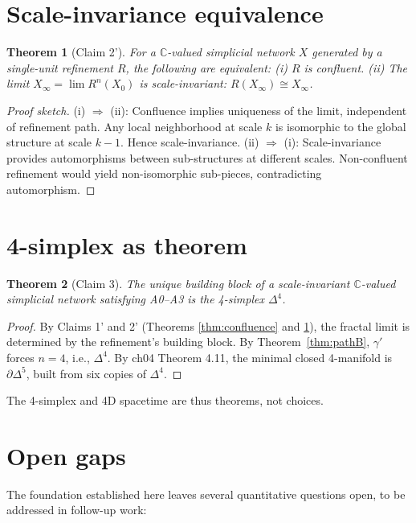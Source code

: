 \documentclass[11pt]{article}
\newtheorem{theorem}{Theorem}
\begin{document}
\section{Scale-invariance equivalence}

\begin{theorem}[Claim 2']
\label{thm:scaleinv}
For a $\mathbb{C}$-valued simplicial network $X$ generated by a
single-unit refinement $R$, the following are equivalent:
(i) $R$ is confluent. (ii) The limit $X_\infty = \lim R^n(X_0)$
is scale-invariant: $R(X_\infty) \cong X_\infty$.
\end{theorem}

\begin{proof}[Proof sketch]
(i) $\Rightarrow$ (ii): Confluence implies uniqueness of the limit,
independent of refinement path. Any local neighborhood at scale $k$
is isomorphic to the global structure at scale $k - 1$. Hence
scale-invariance.
(ii) $\Rightarrow$ (i): Scale-invariance provides automorphisms
between sub-structures at different scales. Non-confluent
refinement would yield non-isomorphic sub-pieces, contradicting
automorphism.
\end{proof}

\section{4-simplex as theorem}

\begin{theorem}[Claim 3]
\label{thm:claim3}
The unique building block of a scale-invariant $\mathbb{C}$-valued
simplicial network satisfying A0--A3 is the 4-simplex $\Delta^4$.
\end{theorem}

\begin{proof}
By Claims 1' and 2' (Theorems \ref{thm:confluence} and
\ref{thm:scaleinv}), the fractal limit is determined by the
refinement's building block. By Theorem~\ref{thm:pathB}, $\gamma'$
forces $n = 4$, i.e., $\Delta^4$. By ch04 Theorem 4.11, the minimal
closed 4-manifold is $\partial \Delta^5$, built from six copies of
$\Delta^4$.
\end{proof}

The 4-simplex and 4D spacetime are thus theorems, not choices.

\section{Open gaps}

The foundation established here leaves several quantitative
questions open, to be addressed in follow-up work:
\end{document}
